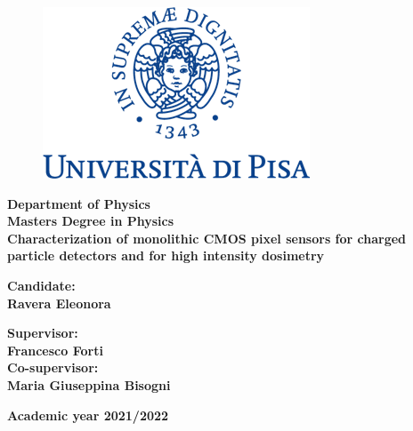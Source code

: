 \begin{figure}
    \centering
    \includegraphics[keepaspectratio=true,scale=0.8]{figures/Logo-UNIPisa.png}
\end{figure}

\begin{center}
    \large{\textbf{Department of Physics\\Masters Degree in Physics}}\\
\vspace{15mm}
    \LARGE{\bf{Characterization of monolithic CMOS pixel sensors for charged particle detectors and for high intensity dosimetry }}
\end{center}
\vspace{30mm}
\begin{minipage}[t]{0.39\textwidth}
\large{\bf Candidate:\\Ravera Eleonora}
\end{minipage}
\hfill
\begin{minipage}[t]{0.55\textwidth}
\raggedleft
\large{\bf Supervisor:\\Francesco Forti}\\
\vspace{7mm}
\large{\bf Co-supervisor:\\Maria Giuseppina Bisogni}\\
\end{minipage}
\vspace{25mm}
\begin{center}
    \large{\bf{Academic year 2021/2022}}
\end{center}